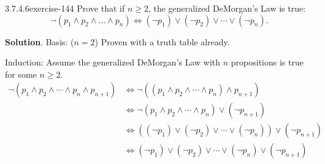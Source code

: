 \documentclass[twoside,10pt,]{book}
\numberwithin{equation}{section}
\begin{document}
\begin{divisionsolution}{3.7.4.6}{}{exercise-144}%
\hypertarget{p-1355}{}%
Prove that if \(n \geq  2\),  the generalized DeMorgan's Law is true:%
\begin{equation*}
\neg (p_1 \land p_2\land \text{...} \land p_n)\Leftrightarrow (\neg p_1)\lor  (\neg p_2) \lor  \cdots
\lor (\neg p_n)\text{.}
\end{equation*}
%
\par\smallskip%
\noindent\textbf{Solution}.\quad%
\hypertarget{p-1356}{}%
Basis:   (\(n=2\))  Proven with a truth table already.%
\par
\hypertarget{p-1357}{}%
Induction:  Assume the generalized DeMorgan's Law with \(n\) propositions is true for some \(n\geq 2\).%
\begin{equation*}
\begin{split}
\neg \left(p_1\land p_2\land  \cdots \land p_n\land p_{n+1}\right) 
& \Leftrightarrow \neg \left(\left(p_1\land p_2\land  \cdots \land p_n\right)\land
p_{n+1}\right)\\
&\Leftrightarrow \neg \left(p_1\land p_2\land  \cdots \land p_n\right)\lor \left(\neg p_{n+1} \right)\\
& \Leftrightarrow \left( \left( \neg p_1\right)\lor \left(\neg p_2\right)\lor  \cdots \lor \left(\neg p_n\right)\right)\lor
\left(\neg p_{n+1}\right)\\
& \Leftrightarrow  \left( \neg p_1\right)\lor \left(\neg p_2\right)\lor  \cdots \lor \left(\neg p_n\right)\lor \left(\neg p_{n+1}\right)
\end{split}
\end{equation*}
%
\end{divisionsolution}%
\end{document}
